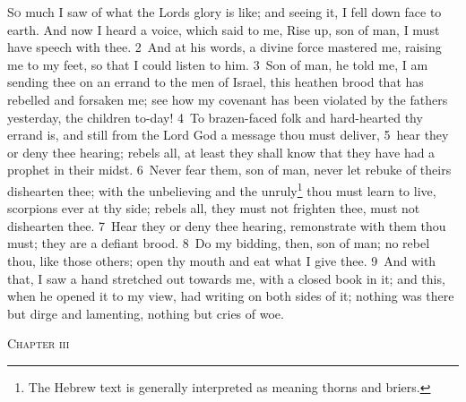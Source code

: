 \documentclass[10pt]{book} %
\begin{document}
\lettrine[lines=2]{S}{o} much I saw of what the Lord\textquotesingle s glory is like; and seeing it, I fell down face to earth. And now I heard a voice, which said to me, Rise up, son of man, I must have speech with thee. \textcolor{benred8}{2}~And at his words, a divine force mastered me, raising me to my feet, so that I could listen to him. \textcolor{benred8}{3}~Son of man, he told me, I am sending thee on an errand to the men of Israel, this heathen brood that has rebelled and forsaken me; see how my covenant has been violated by the fathers yesterday, the children to-day! \textcolor{benred8}{4}~To brazen-faced folk and hard-hearted thy errand is, and still from the Lord God a message thou must deliver, \textcolor{benred8}{5}~hear they or deny thee hearing; rebels all, at least they shall know that they have had a prophet in their midst. \textcolor{benred8}{6}~Never fear them, son of man, never let rebuke of theirs dishearten thee; with the unbelieving and the unruly\footnote[1]{The Hebrew text is generally interpreted as meaning \textasciigrave thorns and briers\textquotesingle .} thou must learn to live, scorpions ever at thy side; rebels all, they must not frighten thee, must not dishearten thee. \textcolor{benred8}{7}~Hear they or deny thee hearing, remonstrate with them thou must; they are a defiant brood.
\textcolor{benred8}{8}~Do my bidding, then, son of man; no rebel thou, like those others; open thy mouth and eat what I give thee. \textcolor{benred8}{9}~And with that, I saw a hand stretched out towards me, with a closed book in it; and this, when he opened it to my view, had writing on both sides of it; nothing was there but dirge and lamenting, nothing but cries of woe.
\begin{large}\begin{center}\textsc{Chapter iii}\end{center}\end{large}
\end{document}
